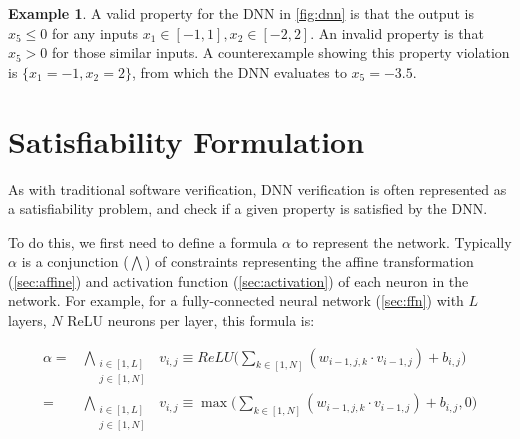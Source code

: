 \documentclass[oneside,11pt,dvipsnames]{book}
\numberwithin{equation}{section}
\theoremstyle{definition}
\newtheorem{example}{Example}[section]
\theoremstyle{remark}
\begin{document}




\begin{example}\label{ex:dnn}
A valid property for the DNN in \autoref{fig:dnn} is that the output is $x_5 \le 0$ for any inputs $x_1 \in [-1,1], x_2\in[-2,2]$. An invalid property is that $x_5 > 0$ for those similar inputs.
A counterexample showing this property violation is $\{x_1=-1, x_2=2\}$, from which the DNN evaluates to $x_5=-3.5$. 
\end{example}



\section{Satisfiability Formulation}\label{sec:satisfiability-and-activation-pattern-search}

As with traditional software verification, DNN verification is often represented as a satisfiability problem, and check if a given property is satisfied by the DNN. 

To do this, we first need to define a formula $\alpha$ to represent the network. Typically $\alpha$ is a conjunction ($\bigwedge$) of constraints representing the affine transformation (\autoref{sec:affine}) and activation function (\autoref{sec:activation}) of each neuron in the network.
For example, for a fully-connected neural network (\autoref{sec:ffn}) with $L$ layers, $N$ ReLU neurons per layer, this formula is:

\begin{align*}
\alpha = &\bigwedge_{\begin{smallmatrix}i \in [1,L]\\ j \in [1,N]\end{smallmatrix}}~~v_{i,j} \equiv ReLU \Big( \sum_{k \in [1,N]} (w_{i-1,j,k} \cdot v_{i-1,j}) + b_{i,j}\Big)    \\
 = &\bigwedge_{\begin{smallmatrix}i \in [1,L]\\ j \in [1,N]\end{smallmatrix}}~~v_{i,j} \equiv \max \Big( \sum_{k \in [1,N]} (w_{i-1,j,k} \cdot v_{i-1,j}) + b_{i,j}, 0 \Big)
\end{align*}
\end{document}
